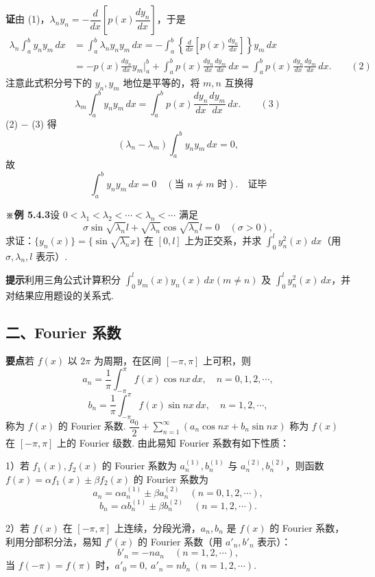 \documentclass[UTF8, 12pt, fontset=fandol, oneside]{ctexart}
\begin{document}
\noindent\textbf{证}\quad 由 (1)，$\lambda_ny_n=-\dfrac d{dx}\left[p(x)\dfrac{dy_n}{dx}\right]$，于是
\[
\begin{aligned}
\lambda_n\int_a^b y_ny_m\,dx
&=\int_a^b\lambda_ny_ny_m\,dx
=-\int_a^b\left\{\frac d{dx}\left[p(x)\frac{dy_n}{dx}\right]\right\}y_m\,dx\\
&=-p(x)\frac{dy_n}{dx}y_m\bigg|_a^b
+\int_a^b p(x)\frac{dy_n}{dx}\frac{dy_m}{dx}\,dx
=\int_a^b p(x)\frac{dy_n}{dx}\frac{dy_m}{dx}\,dx. \qquad(2)
\end{aligned}
\]
注意此式积分号下的 $y_n,y_m$ 地位是平等的，将 $m,n$ 互换得
\[
  \lambda_m\int_a^b y_ny_m\,dx
  =\int_a^b p(x)\frac{dy_n}{dx}\frac{dy_m}{dx}\,dx. \qquad(3)
\]
(2) $-$ (3) 得
\[
  (\lambda_n-\lambda_m)\int_a^b y_ny_m\,dx=0,
\]
故
\[
  \int_a^b y_ny_m\,dx=0\quad(\text{当 }n\ne m\text{ 时}).\quad\text{证毕}
\]

\noindent\textbf{※例 5.4.3}\quad 设 $0<\lambda_1<\lambda_2<\cdots<\lambda_n<\cdots$ 满足
\[
  \sigma\sin\sqrt{\lambda_n}l+\sqrt{\lambda_n}\cos\sqrt{\lambda_n}l=0\quad(\sigma>0),
\]
求证：$\{y_n(x)\}=\{\sin\sqrt{\lambda_n}x\}$ 在 $[0,l]$ 上为正交系，并求 $\displaystyle\int_0^l y_n^2(x)\,dx$（用 $\sigma,\lambda_n,l$ 表示）.

\noindent\textbf{提示}\quad 利用三角公式计算积分 $\displaystyle\int_0^l y_m(x)y_n(x)\,dx(m\ne n)$ 及 $\displaystyle\int_0^l y_n^2(x)\,dx$，并对结果应用题设的关系式.

\subsection*{二、Fourier 系数}

\noindent\textbf{要点}\quad 若 $f(x)$ 以 $2\pi$ 为周期，在区间 $[-\pi,\pi]$ 上可积，则
\[
  a_n=\frac1\pi\int_{-\pi}^{\pi}f(x)\cos nx\,dx,\quad n=0,1,2,\cdots,
\]
\[
  b_n=\frac1\pi\int_{-\pi}^{\pi}f(x)\sin nx\,dx,\quad n=1,2,\cdots,
\]
称为 $f(x)$ 的 Fourier 系数. $\dfrac{a_0}2+\displaystyle\sum_{n=1}^{\infty}(a_n\cos nx+b_n\sin nx)$ 称为 $f(x)$ 在 $[-\pi,\pi]$ 上的 Fourier 级数. 由此易知 Fourier 系数有如下性质：

1）若 $f_1(x),f_2(x)$ 的 Fourier 系数为 $a_n^{(1)},b_n^{(1)}$ 与 $a_n^{(2)},b_n^{(2)}$，则函数 $f(x)=\alpha f_1(x)\pm\beta f_2(x)$ 的 Fourier 系数为
\[
  a_n=\alpha a_n^{(1)}\pm\beta a_n^{(2)}\quad(n=0,1,2,\cdots),
\]
\[
  b_n=\alpha b_n^{(1)}\pm\beta b_n^{(2)}\quad(n=1,2,\cdots).
\]

2）若 $f(x)$ 在 $[-\pi,\pi]$ 上连续，分段光滑，$a_n,b_n$ 是 $f(x)$ 的 Fourier 系数，利用分部积分法，易知 $f'(x)$ 的 Fourier 系数（用 $a'_n,b'_n$ 表示）：
\[
  b'_n=-na_n\quad(n=1,2,\cdots),
\]
当 $f(-\pi)=f(\pi)$ 时，$a'_0=0,\ a'_n=nb_n\ (n=1,2,\cdots)$.
\end{document}
